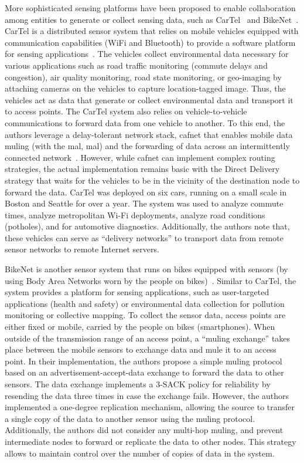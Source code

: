 More sophisticated sensing platforms have been proposed to enable collaboration among entities to generate or collect sensing data, such as CarTel~\cite{hull2006cartel} and BikeNet~\cite{eisenman2009bikenet}. CarTel is a distributed sensor system that relies on mobile vehicles equipped with communication capabilities (\eg WiFi and Bluetooth) to provide a software platform for sensing applications~\cite{hull2006cartel}. The vehicles collect environmental data necessary for various applications such as road traffic monitoring (commute delays and congestion), air quality monitoring, road state monitoring, or geo-imaging by attaching cameras on the vehicles to capture location-tagged image. Thus, the vehicles act as data  that generate or collect environmental data and transport it to access points. The CarTel system also relies on vehicle-to-vehicle communications to forward data from one vehicle to another. To this end, the authors leverage a delay-tolerant network stack, \acrfull{cafnet} that enables mobile data muling (with the \acrlong{mal}, \acrshort{mal}) and the forwarding of data across an intermittently connected network~\cite{chen2007cafnet}. However, while \acrshort{cafnet} can implement complex routing strategies, the actual implementation remains basic with the Direct Delivery strategy that waits for the vehicles to be in the vicinity of the destination node to forward the data. CarTel was deployed on six cars, running on a small scale in Boston and Seattle for over a year. The system was used to analyze commute times, analyze metropolitan Wi-Fi deployments, analyze road conditions (potholes), and for automotive diagnostics. Additionally, the authors note that, these vehicles can serve as ``delivery networks'' to transport data from remote sensor networks to remote Internet servers. 

BikeNet is another sensor system that runs on bikes equipped with sensors (\eg by using Body Area Networks worn by the people on bikes)~\cite{eisenman2009bikenet}. Similar to CarTel, the system provides a platform for sensing applications, such as user-targeted applications (\eg health and safety) or environmental data collection for pollution monitoring or collective mapping. To collect the sensor data, access points are either fixed or mobile, carried by the people on bikes (\eg smartphones). When outside of the transmission range of an access point, a ``muling exchange'' takes place between the mobile sensors to exchange data and mule it to an access point. In their implementation, the authors propose a simple muling protocol based on an advertisement-accept-data exchange to forward the data to other sensors. The data exchange implements a 3-SACK policy for reliability by resending the data three times in case the exchange fails. However, the authors implemented a one-degree replication mechanism, allowing the source to transfer a single copy of the data to another sensor using the muling protocol. Additionally, the authors did not consider any multi-hop muling, and prevent intermediate nodes to forward or replicate the data to other nodes. This strategy allows to maintain control over the number of copies of data in the system. 

